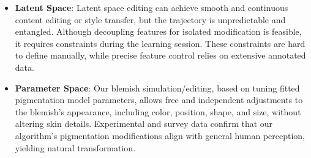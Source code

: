 \begin{spacing}{1.5}
\begin{itemize}
    \item \textbf{Latent Space}: Latent space editing can achieve smooth and continuous content editing or style transfer, but the trajectory is unpredictable and entangled. Although decoupling features for isolated modification is feasible, it requires constraints during the learning session. These constraints are hard to define manually, while precise feature control relies on extensive annotated data.

    \item \textbf{Parameter Space}: Our blemish simulation/editing, based on tuning fitted pigmentation model parameters, allows free and independent adjustments to the blemish's appearance, including color, position, shape, and size, without altering skin details. Experimental and survey data confirm that our algorithm's pigmentation modifications align with general human perception, yielding natural transformation.
\end{itemize}

\end{spacing}
\newpage
